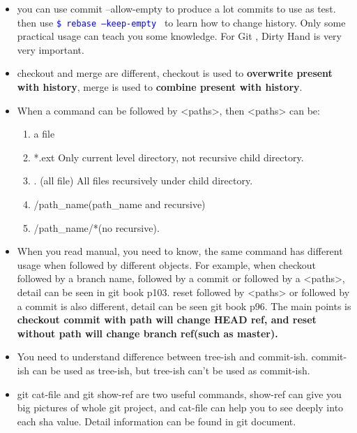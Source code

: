 \documentclass[a4paper,12pt,twoside]{book}
\newcommand{\linuxcommand}[1]{\texttt{\textcolor{blue}{\$ #1 \Pisymbol{psy}{191}}}}
\begin{document}
\begin{itemize}
\item you can use commit --allow-empty to produce a lot commits to use as test. then use \linuxcommand{rebase --keep-empty } to learn how to change history. Only some practical usage can teach you some knowledge. For Git , Dirty Hand is very very important.
        
        \item checkout and merge are different, checkout is used to \textbf{overwrite present with history}, merge is used to \textbf{combine present with history}.  

         \item When a command can be followed by <paths>, then <paths> can be:
				 \begin{enumerate}
						 \item a file 
							\item *.ext  Only current level directory, not recursive child directory.
							\item . (all file) All files recursively under child directory.
							\item /path\_name(path\_name and recursive) 
							\item /path\_name/*(no recursive). 
					\end{enumerate}
			\item When you read manual, you need to know, the same command has different usage when followed by different objects. For example, when checkout followed by a branch name, followed by a commit or followed by a <paths>, detail can be seen in git book p103.  reset followed by <paths> or followed by a commit is also different, detail can be seen git book p96. The main points is \textbf{checkout commit with path will change HEAD ref, and reset without path will change branch ref(such as master).}
         
         \item You need to understand difference between tree-ish and commit-ish. commit-ish can be used as tree-ish, but tree-ish can't be used as commit-ish. 
		 \item git cat-file and git show-ref are two useful commands, show-ref can give you big pictures of whole git project, and cat-file can help you to see deeply into each sha value. Detail information can be found in git document.                 
\end{itemize}
\end{document}
